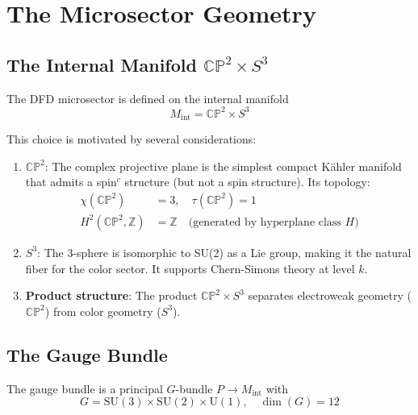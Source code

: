 \documentclass[11pt,a4paper]{article}
\newcommand{\CP}{\mathbb{CP}}
\newcommand{\Z}{\mathbb{Z}}
\begin{document}
\section{The Microsector Geometry}

\subsection{The Internal Manifold $\CP^2 \times S^3$}

The DFD microsector is defined on the internal manifold
\begin{equation}
M_{\text{int}} = \CP^2 \times S^3
\end{equation}

This choice is motivated by several considerations:

\begin{enumerate}
\item \textbf{$\CP^2$}: The complex projective plane is the simplest compact Kähler manifold that admits a spin$^c$ structure (but not a spin structure). Its topology:
\begin{align}
\chi(\CP^2) &= 3, \quad \tau(\CP^2) = 1 \\
H^2(\CP^2, \Z) &= \Z \quad \text{(generated by hyperplane class } H\text{)}
\end{align}

\item \textbf{$S^3$}: The 3-sphere is isomorphic to SU(2) as a Lie group, making it the natural fiber for the color sector. It supports Chern-Simons theory at level $k$.

\item \textbf{Product structure}: The product $\CP^2 \times S^3$ separates electroweak geometry ($\CP^2$) from color geometry ($S^3$).
\end{enumerate}

\subsection{The Gauge Bundle}

The gauge bundle is a principal $G$-bundle $P \to M_{\text{int}}$ with
\begin{equation}
G = \text{SU}(3) \times \text{SU}(2) \times \text{U}(1), \quad \dim(G) = 12
\end{equation}
\end{document}
